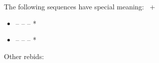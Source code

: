 The following sequences have special meaning: \force\ \inv+
\begin{itemize}
  \item {} --  --  -- *
  \item {} --  --  -- *
\end{itemize}

Other rebids: \nat\ \nf
